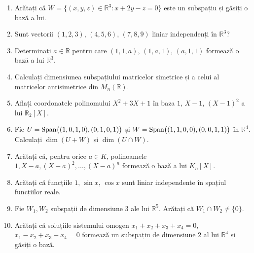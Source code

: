 \begin{enumerate}[label=\textbf{\arabic*.},leftmargin=*]
\item Arătați că $W=\{(x,y,z)\in\mathbb{R}^3: x+2y-z=0\}$ este un subspațiu și găsiți o bază a lui.
\item Sunt vectorii $(1,2,3)$, $(4,5,6)$, $(7,8,9)$ liniar independenți în $\mathbb{R}^3$?
\item Determinați $a\in\mathbb{R}$ pentru care $(1,1,a)$, $(1,a,1)$, $(a,1,1)$ formează o bază a lui $\mathbb{R}^3$.
\item Calculați dimensiunea subspațiului matricelor simetrice și a celui al matricelor antisimetrice din $M_n(\mathbb{R})$.
\item Aflați coordonatele polinomului $X^2+3X+1$ în baza $1$, $X-1$, $(X-1)^2$ a lui $\mathbb{R}_2[X]$.
\item Fie $U=\operatorname{Span}\bigl((1,0,1,0),(0,1,0,1)\bigr)$ și $W=\operatorname{Span}\bigl((1,1,0,0),(0,0,1,1)\bigr)$ în $\mathbb{R}^4$. Calculați $\dim(U+W)$ și $\dim(U\cap W)$.
\item Arătați că, pentru orice $a\in K$, polinoamele $1,X-a,(X-a)^2,\dots,(X-a)^n$ formează o bază a lui $K_n[X]$.
\item Arătați că funcțiile $1$, $\sin x$, $\cos x$ sunt liniar independente în spațiul funcțiilor reale.
\item Fie $W_1,W_2$ subspații de dimensiune $3$ ale lui $\mathbb{R}^5$. Arătați că $W_1\cap W_2\neq\{0\}$.
\item Arătați că soluțiile sistemului omogen $x_1+x_2+x_3+x_4=0$, $x_1-x_2+x_3-x_4=0$ formează un subspațiu de dimensiune $2$ al lui $\mathbb{R}^4$ și găsiți o bază.
\end{enumerate}

